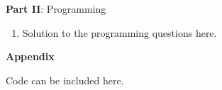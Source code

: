 \documentclass[12pt]{article}
\begin{document}
\center\large{\textbf{Part II}: Programming}

\begin{enumerate}[leftmargin=\labelsep,resume]
\item Solution to the programming questions here.
\end{enumerate}

\center\large{\textbf{Appendix}\vskip 0.3cm}

Code can be included here.
\end{document}
